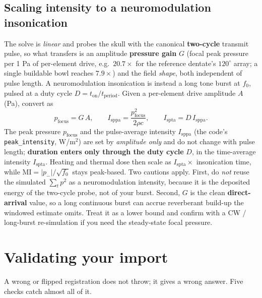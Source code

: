 \documentclass[10pt]{article}
\newcommand{\code}[1]{\lstinline[basicstyle=\ttfamily]|#1|}
\begin{document}
\subsection{Scaling intensity to a neuromodulation insonication}

The solve is \emph{linear} and probes the skull with the canonical \textbf{two-cycle}
transmit pulse, so what transfers is an amplitude \textbf{pressure gain} $G$ (focal peak
pressure per 1 Pa of per-element drive, e.g.\ $20.7\times$ for the reference dentate's
$120^\circ$ array; a single buildable bowl reaches $7.9\times$) and
the field \emph{shape}, both independent of pulse length. A neuromodulation insonication
is instead a long tone burst at $f_0$, pulsed at a duty cycle
$D=t_\mathrm{on}/t_\mathrm{period}$. Given a per-element drive amplitude $A$ (Pa), convert
as
\[
p_\text{focus}=G\,A,\qquad
I_\mathrm{sppa}=\frac{p_\text{focus}^2}{2\rho c},\qquad
I_\mathrm{spta}=D\,I_\mathrm{sppa}.
\]
The peak pressure $p_\text{focus}$ and the pulse-average intensity $I_\mathrm{sppa}$
(the code's \code{peak_intensity}, W/m$^2$) are set by \emph{amplitude only} and do not
change with pulse length; \textbf{duration enters only through the duty cycle} $D$, in
the time-average intensity $I_\mathrm{spta}$. Heating and thermal dose then scale as
$I_\mathrm{spta}\times$ insonication time, while $\mathrm{MI}=\lvert p_-\rvert/\sqrt{f_0}$
stays peak-based. Two cautions apply. First, do \emph{not} reuse the simulated $\sum_t p^2$ as a
neuromodulation intensity, because it is the deposited energy of the two-cycle probe, not of
your burst. Second, $G$ is the clean \textbf{direct-arrival} value, so a long continuous
burst can accrue reverberant build-up the windowed estimate omits. Treat it as a lower
bound and confirm with a CW / long-burst re-simulation if you need the steady-state focal
pressure.

\section{Validating your import}\label{sec:validate}

A wrong or flipped registration does not throw; it gives a wrong answer. Five
 checks catch almost all of it.
\end{document}
